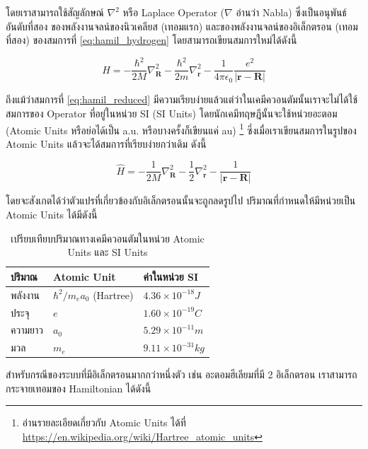 \noindent โดยเราสามารถใช้สัญลักษณ์ $\nabla^{2}$ หรือ Laplace Operator ($\nabla$ อ่านว่า Nabla) ซึ่งเป็นอนุพันธ์อันดับที่สอง%
ของพลังงานจลน์ของนิวเคลียส (เทอมแรก) และของพลังงานจลน์ของอิเล็กตรอน (เทอมที่สอง) ของสมการที่ \ref{eq:hamil_hydrogen} 
โดยสามารถเขียนสมการใหม่ได้ดังนี้

\begin{equation}\label{eq:hamil_reduced}
    \hat{H} = -\frac{\hbar^{2}}{2M} \nabla^{2}_{\bm{R}} - \frac{\hbar^{2}}{2m} \nabla^{2}_{\bm{r}}
              -\frac{1}{4\pi\epsilon_{0}}\frac{e^{2}}{|\bm{r}-\bm{R}|}
\end{equation}

ถึงแม้ว่าสมการที่ \ref{eq:hamil_reduced} มีความเรียบง่ายแล้วแต่ว่าในเคมีควอนตัมนั้นเราจะไม่ได้ใช้สมการของ Operator ที่อยู่ในหน่วย
SI (SI Units) โดยนักเคมีทฤษฎีนั้นจะใช้หน่วยอะตอม (Atomic Units หรือย่อได้เป็น a.u. หรือบางครั้งก็เขียนแค่ au)%
\footnote{อ่านรายละเอียดเกี่ยวกับ Atomic Units ได้ที่ \url{https://en.wikipedia.org/wiki/Hartree_atomic_units}} 
ซึ่งเมื่อเราเขียนสมการในรูปของ Atomic Units แล้วจะได้สมการที่เรียบง่ายกว่าเดิม ดังนี้

\begin{equation}\label{eq:hamil_au}
    \hat{H} = -\frac{1}{2M} \nabla^{2}_{\bm{R}} 
              -\frac{1}{2} \nabla^{2}_{\bm{r}}
              -\frac{1}{|\bm{r}-\bm{R}|}
\end{equation}

\noindent โดยจะสังเกตได้ว่าตัวแปรที่เกี่ยวข้องกับอิเล็กตรอนนั้นจะถูกลดรูปไป ปริมาณที่กำหนดให้มีหน่วยเป็น Atomic Units ได้มีดังนี้

\begin{table}[H]
    \centering
    \caption{เปรียบเทียบปริมาณทางเคมีควอนตัมในหน่วย Atomic Units และ SI Units}
    \label{tab:atomic_units}
    \begin{tabular}{lll}\toprule
    \textbf{ปริมาณ} &\textbf{Atomic Unit} &\textbf{ค่าในหน่วย SI} \\\midrule
    พลังงาน & $\hbar^{2}/m_{e}a_{0}$ (Hartree) & $4.36 \times 10^{-18} J$ \\
    ประจุ & $e$ & $1.60 \times 10^{-19} C$ \\
    ความยาว & $a_{0}$ & $5.29 \times 10^{-11} m$ \\
    มวล & $m_{e}$ & $9.11 \times 10^{-31} kg$ \\
    \bottomrule
    \end{tabular}
\end{table}

สำหรับกรณีของระบบที่มีอิเล็กตรอนมากกว่าหนึ่งตัว เช่น อะตอมฮีเลียมที่มี 2 อิเล็กตรอน เราสามารถกระจายเทอมของ Hamiltonian ได้ดังนี้

